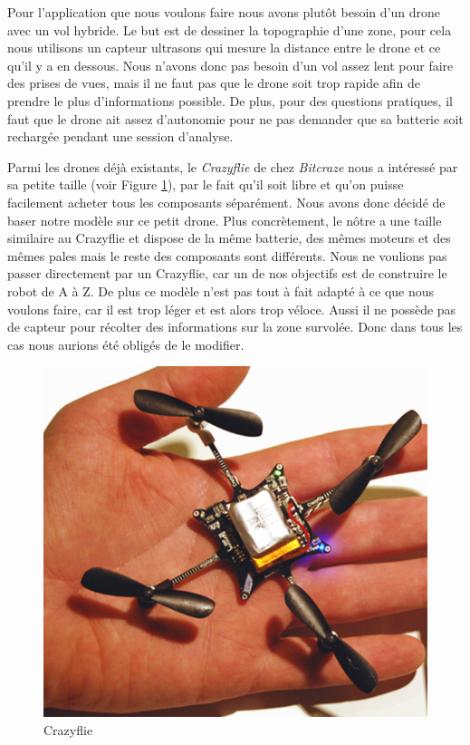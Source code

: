 \documentclass[a4paper,10pt]{report}
\begin{document}
    Pour l'application que nous voulons faire nous avons plutôt besoin d'un 
drone avec un vol hybride. Le but est de dessiner la topographie d'une zone, 
pour cela nous utilisons un capteur ultrasons qui mesure la distance entre le 
drone et ce qu'il y a en dessous. Nous n'avons donc pas besoin d'un vol assez 
lent pour faire des prises de vues, mais il ne faut pas que le drone soit trop 
rapide afin de prendre le plus d'informations possible. De plus, pour des 
questions pratiques, il faut que le drone ait assez d'autonomie pour ne pas 
demander que sa batterie soit rechargée pendant une session d'analyse.
    
    Parmi les drones déjà existants, le \textit{Crazyflie} de chez 
\textit{Bitcraze}\cite{bitcraze} nous a intéressé par sa petite taille (voir 
Figure \ref{crazyflie}), par le fait qu'il soit libre et qu'on puisse 
facilement 
acheter tous les composants séparément. Nous avons donc décidé de baser notre 
modèle sur ce petit drone. Plus concrètement, le nôtre a une taille similaire 
au Crazyflie et dispose de la même batterie, des mêmes moteurs et des mêmes 
pales mais le reste des composants sont différents. Nous ne voulions pas passer 
directement par un Crazyflie, car un de nos objectifs est de construire le 
robot 
de A à Z. De plus ce modèle n'est pas tout à fait adapté à ce que nous voulons 
faire, car il est trop léger et est alors trop véloce. Aussi il ne possède 
pas de capteur pour récolter des informations sur la zone survolée. Donc dans 
tous les cas nous aurions été obligés de le modifier.
    
    \begin{figure}[htbp]%
      \centering
      \includegraphics[scale = 0.25]{img/crazyflie.png}
      \caption{Crazyflie}
      \label{crazyflie}
    \end{figure}
    
\end{document}
